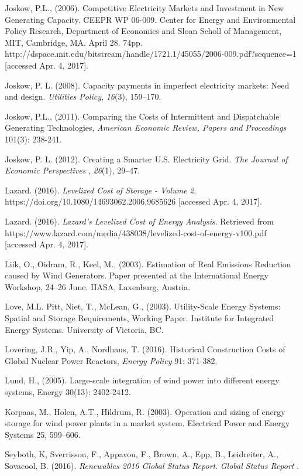 \documentclass[10pt,letter]{article}
\begin{document}
Joskow, P.L., (2006). Competitive Electricity Markets and Investment in
New Generating Capacity. CEEPR WP 06-009. Center for Energy and
Environmental Policy Research, Department of Economics and Sloan Scholl
of Management, MIT, Cambridge, MA. April 28. 74pp.
http://dspace.mit.edu/bitstream/handle/1721.1/45055/2006-009.pdf?sequence=1
{[}accessed Apr. 4, 2017{]}.

Joskow, P. L. (2008). Capacity payments in imperfect electricity
markets: Need and design. \emph{Utilities Policy}, \emph{16}(3),
159--170.

Joskow, P.L., (2011). Comparing the Costs of Intermittent and
Dispatchable Generating Technologies, \emph{American Economic Review,
Papers and Proceedings} 101(3): 238-241.

Joskow, P. L. (2012). Creating a Smarter U.S. Electricity Grid.
\emph{The Journal of Economic Perspectives} , \emph{26}(1), 29--47.

Lazard. (2016). \emph{Levelized Cost of Storage - Volume 2}.
https://doi.org/10.1080/14693062.2006.9685626 {[}accessed Apr. 4,
2017{]}.

Lazard. (2016). \emph{Lazard's Levelized Cost of Energy Analysis}.
Retrieved from
https://www.lazard.com/media/438038/levelized-cost-of-energy-v100.pdf
{[}accessed Apr. 4, 2017{]}.

Liik, O., Oidram, R., Keel, M., (2003). Estimation of Real Emissions
Reduction caused by Wind Generators. Paper presented at the
International Energy Workshop, 24--26 June. IIASA, Laxenburg, Austria.

Love, M.L. Pitt, Niet, T., McLean, G., (2003). Utility-Scale Energy
Systems: Spatial and Storage Requirements, Working Paper. Institute for
Integrated Energy Systems. University of Victoria, BC.

Lovering, J.R., Yip, A., Nordhaus, T. (2016). Historical Construction
Costs of Global Nuclear Power Reactors, \emph{Energy Policy} 91:
371-382.

Lund, H., (2005). Large-scale integration of wind power into different
energy systems, Energy 30(13): 2402-2412.

Korpaas, M., Holen, A.T., Hildrum, R. (2003). Operation and sizing of
energy storage for wind power plants in a market system. Electrical
Power and Energy Systems 25, 599--606.

Seyboth, K, Sverrisson, F., Appavou, F., Brown, A., Epp, B., Leidreiter,
A., Sovacool, B. (2016). \emph{Renewables 2016 Global Status Report}.
\emph{Global Status Report} .
\end{document}
